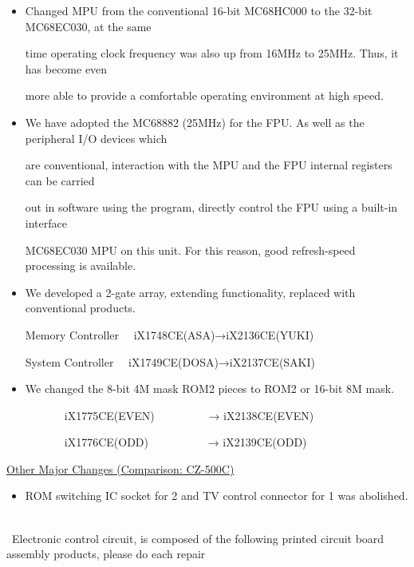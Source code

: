 ﻿\documentclass[twoside,a4paper,12pt]{article}
\begin{document}
\renewcommand{\labelitemi}{\scriptsize●}
\small
\begin{itemize}[leftmargin=25mm, itemsep=-1mm, topsep=1mm]
\item
Changed MPU from the conventional 16-bit MC68HC000 to the 32-bit MC68EC030, at the same

time operating clock frequency was also up from 16MHz to 25MHz. Thus, it has become even

more able to provide a comfortable operating environment at high speed.
\item
We have adopted the MC68882 (25MHz) for the FPU. As well as the peripheral I/O devices which

are conventional, interaction with the MPU and the FPU internal registers can be carried

out in software using the program, directly control the FPU using a built-in interface

MC68EC030 MPU on this unit. For this reason, good refresh-speed processing is available.
\item
We developed a 2-gate array, extending functionality, replaced with conventional products.

Memory Controller \ \ iX1748CE(ASA)→iX2136CE(YUKI)

System Controller \ \ iX1749CE(DOSA)→iX2137CE(SAKI)
\item
We changed the 8-bit 4M mask ROM2 pieces to ROM2 or 16-bit 8M mask.

\ \ \ \ \ \ \ iX1775CE(EVEN) \ \ \ \ \ \ \ \ \ → iX2138CE(EVEN)

\ \ \ \ \ \ \ iX1776CE(ODD) \ \ \ \ \ \ \ \ \ \ → iX2139CE(ODD)
\end{itemize}

\uline{Other Major Changes (Comparison: CZ-500C)}

\begin{itemize}[leftmargin=25mm, itemsep=-1mm, topsep=1mm]
\item
ROM switching IC socket for 2 and TV control connector for 1 was abolished.\\
\end{itemize}

\ \\[-3mm]

\scriptsize \ Electronic control circuit, is composed of the following printed circuit board assembly products, please do each repair
\end{document}
